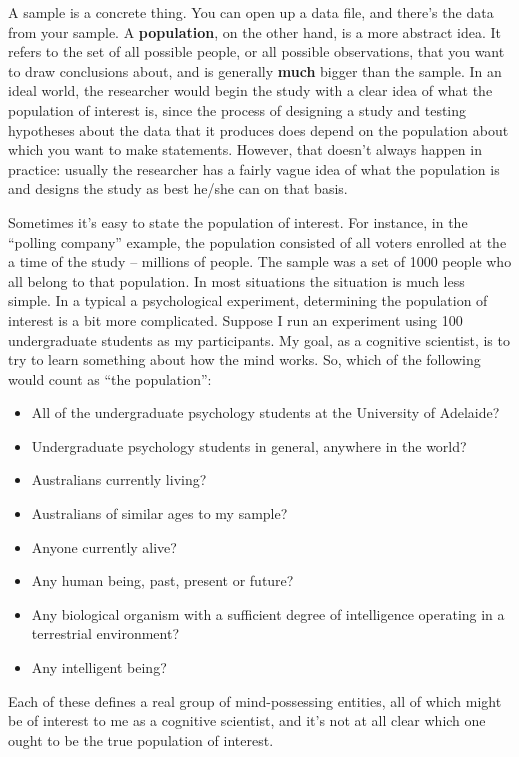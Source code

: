 \documentclass[
]{book}
\begin{document}
A sample is a concrete thing. You can open up a data file, and there's the data from your sample. A \textbf{population}, on the other hand, is a more abstract idea. It refers to the set of all possible people, or all possible observations, that you want to draw conclusions about, and is generally \textbf{much} bigger than the sample. In an ideal world, the researcher would begin the study with a clear idea of what the population of interest is, since the process of designing a study and testing hypotheses about the data that it produces does depend on the population about which you want to make statements. However, that doesn't always happen in practice: usually the researcher has a fairly vague idea of what the population is and designs the study as best he/she can on that basis.

Sometimes it's easy to state the population of interest. For instance, in the ``polling company'' example, the population consisted of all voters enrolled at the a time of the study -- millions of people. The sample was a set of 1000 people who all belong to that population. In most situations the situation is much less simple. In a typical a psychological experiment, determining the population of interest is a bit more complicated. Suppose I run an experiment using 100 undergraduate students as my participants. My goal, as a cognitive scientist, is to try to learn something about how the mind works. So, which of the following would count as ``the population'':

\begin{itemize}
\item
  All of the undergraduate psychology students at the University of Adelaide?
\item
  Undergraduate psychology students in general, anywhere in the world?
\item
  Australians currently living?
\item
  Australians of similar ages to my sample?
\item
  Anyone currently alive?
\item
  Any human being, past, present or future?
\item
  Any biological organism with a sufficient degree of intelligence operating in a terrestrial environment?
\item
  Any intelligent being?
\end{itemize}

Each of these defines a real group of mind-possessing entities, all of which might be of interest to me as a cognitive scientist, and it's not at all clear which one ought to be the true population of interest.
\end{document}
